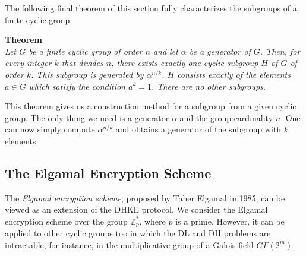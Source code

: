 \documentclass[11pt, a4paper]{article}
\newcommand{\gf}[1]{\textit{GF}(#1)}
\begin{document}
The following final theorem of this section fully characterizes the subgroups of a finite cyclic group:
\begin{framed}
    \hfill\break\textbf{Theorem}\\
    \textit{Let $G$ be a finite cyclic group of order $n$ and let $\alpha$ be a generator of $G$. Then, for every integer $k$ that divides $n$, there exists exactly one cyclic subgroup $H$ of $G$ of order $k$. This subgroup is generated by $\alpha^{n/k}$. $H$ consists exactly of the elements $a\in G$ which satisfy the condition $a^k=1$. There are no other subgroups.}
\end{framed}
This theorem gives us a construction method for a subgroup from a given cyclic group. The only thing we need is a generator $\alpha$ and the group cardinality $n$. One can now simply compute $\alpha^{n/k}$ and obtains a generator of the subgroup with $k$ elements.

\newpage
\subsection{The Elgamal Encryption Scheme}
The \textit{Elgamal encryption scheme}, proposed by Taher Elgamal in 1985, can be viewed as an extension of the DHKE protocol. We consider the Elgamal encryption scheme over the group $\mathbb{Z}_p^*$, where $p$ is a prime. However, it can be applied to other cyclic groups too in which the DL and DH problems are intractable, for instance, in the multiplicative group of a Galois field $\gf{2^m}$.
\end{document}
